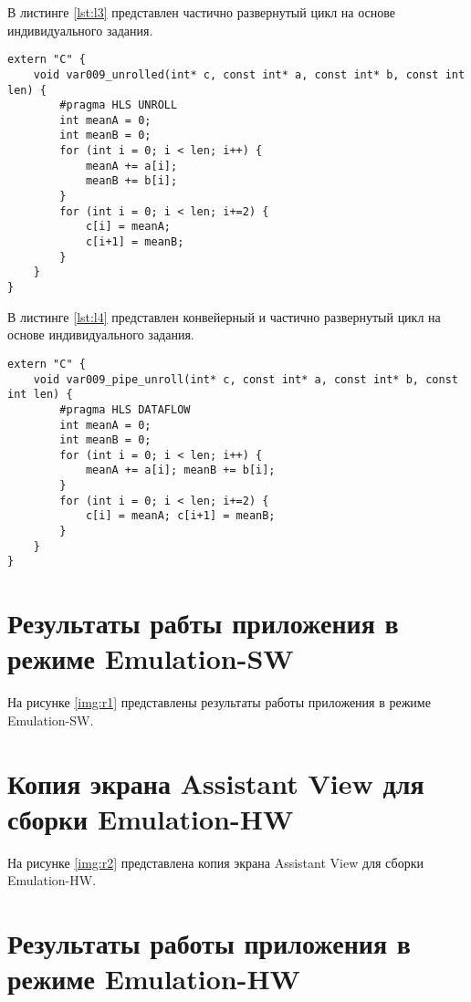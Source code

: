 В листинге \ref{lst:l3} представлен частично развернутый цикл на основе индивидуального задания.
\captionsetup{singlelinecheck = false, justification=raggedright}
\begin{lstlisting}[label=lst:l3,caption=Индивидуальный вариант 9]
extern "C" {
	void var009_unrolled(int* c, const int* a, const int* b, const int len) {
		#pragma HLS UNROLL
		int meanA = 0;
		int meanB = 0;
		for (int i = 0; i < len; i++) {
			meanA += a[i];
			meanB += b[i];
		}
		for (int i = 0; i < len; i+=2) {
			c[i] = meanA;
			c[i+1] = meanB;
		}
	}
}

\end{lstlisting}

В листинге \ref{lst:l4} представлен конвейерный и частично развернутый цикл на основе индивидуального задания.
\captionsetup{singlelinecheck = false, justification=raggedright}
\begin{lstlisting}[label=lst:l4,caption=Индивидуальный вариант 9]
extern "C" {
	void var009_pipe_unroll(int* c, const int* a, const int* b, const int len) {
		#pragma HLS DATAFLOW
		int meanA = 0;
		int meanB = 0;
		for (int i = 0; i < len; i++) {
			meanA += a[i]; meanB += b[i];
		}
		for (int i = 0; i < len; i+=2) {
			c[i] = meanA; c[i+1] = meanB;
		}
	}
}
\end{lstlisting}


\chapter*{Результаты рабты приложения в режиме Emulation-SW}

На рисунке \ref{img:r1} представлены результаты работы приложения в режиме Emulation-SW.



\chapter*{Копия экрана Assistant View для сборки Emulation-HW}

На рисунке \ref{img:r2} представлена копия экрана Assistant View для сборки Emulation-HW.



\chapter*{Результаты работы приложения в режиме Emulation-HW}

